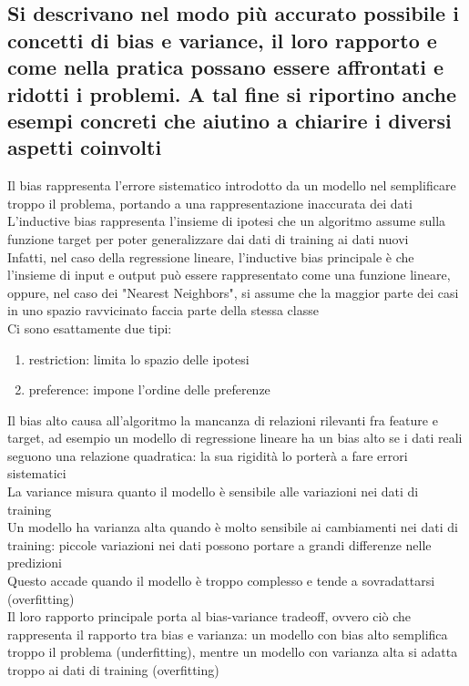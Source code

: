 \documentclass[10pt,oneside,a4paper]{article}
\begin{document}
	\subsection{Si descrivano nel modo più accurato possibile i concetti di bias e variance, il loro rapporto e come nella pratica possano essere affrontati e ridotti i problemi. A tal fine si riportino anche esempi concreti che aiutino a chiarire i diversi aspetti coinvolti}
	Il bias rappresenta l'errore sistematico introdotto da un modello nel semplificare troppo il problema, portando a una rappresentazione inaccurata dei dati\\
	L'inductive bias rappresenta l'insieme di ipotesi che un algoritmo assume sulla funzione target per poter generalizzare dai dati di training ai dati nuovi\\
	Infatti, nel caso della regressione lineare, l'inductive bias principale è che l'insieme di input e output può essere rappresentato come una funzione lineare, oppure, nel caso dei "Nearest Neighbors", si assume che la maggior parte dei casi in uno spazio ravvicinato faccia parte della stessa classe \\
	Ci sono esattamente due tipi:
	\begin{enumerate}
		\item restriction: limita lo spazio delle ipotesi
		\item preference: impone l'ordine delle preferenze
	\end{enumerate}
	Il bias alto causa all'algoritmo la mancanza di relazioni rilevanti fra feature e target, ad esempio un modello di regressione lineare ha un bias alto se i dati reali seguono una relazione quadratica: la sua rigidità lo porterà a fare errori sistematici\\
	La variance misura quanto il modello è sensibile alle variazioni nei dati di training\\
	Un modello ha varianza alta quando è molto sensibile ai cambiamenti nei dati di training: piccole variazioni nei dati possono portare a grandi differenze nelle predizioni\\
	Questo accade quando il modello è troppo complesso e tende a sovradattarsi (overfitting)\\
	Il loro rapporto principale porta al bias-variance tradeoff, ovvero ciò che rappresenta il rapporto tra bias e varianza: un modello con bias alto semplifica troppo il problema (underfitting), mentre un modello con varianza alta si adatta troppo ai dati di training (overfitting)\\
\end{document}
